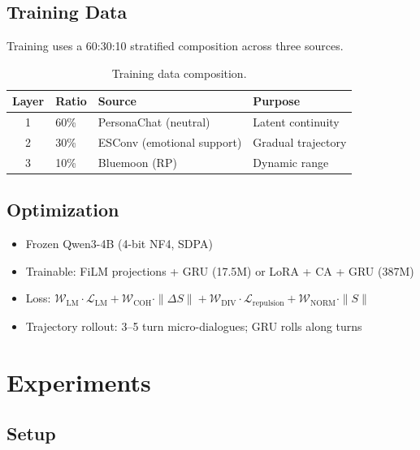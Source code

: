 \documentclass[11pt,a4paper]{article}
\begin{document}
\subsection{Training Data}

Training uses a 60:30:10 stratified composition across three sources.

\begin{table}[h]
\centering
\begin{tabular}{clll}
\toprule
\textbf{Layer} & \textbf{Ratio} & \textbf{Source} & \textbf{Purpose} \\
\midrule
1 & 60\% & PersonaChat (neutral)      & Latent continuity  \\
2 & 30\% & ESConv (emotional support) & Gradual trajectory \\
3 & 10\% & Bluemoon (RP)              & Dynamic range      \\
\bottomrule
\end{tabular}
\caption{Training data composition.}
\end{table}

\subsection{Optimization}

\begin{itemize}
  \item Frozen Qwen3-4B (4-bit NF4, SDPA)
  \item Trainable: FiLM projections + GRU (17.5M) or LoRA + CA + GRU (387M)
  \item Loss: $\mathcal{W}_{\mathrm{LM}}\cdot\mathcal{L}_{\mathrm{LM}} + \mathcal{W}_{\mathrm{COH}}\cdot\|\Delta S\| + \mathcal{W}_{\mathrm{DIV}}\cdot\mathcal{L}_{\mathrm{repulsion}} + \mathcal{W}_{\mathrm{NORM}}\cdot\|S\|$
  \item Trajectory rollout: 3--5 turn micro-dialogues; GRU rolls along turns
\end{itemize}

\section{Experiments}

\subsection{Setup}
\end{document}
